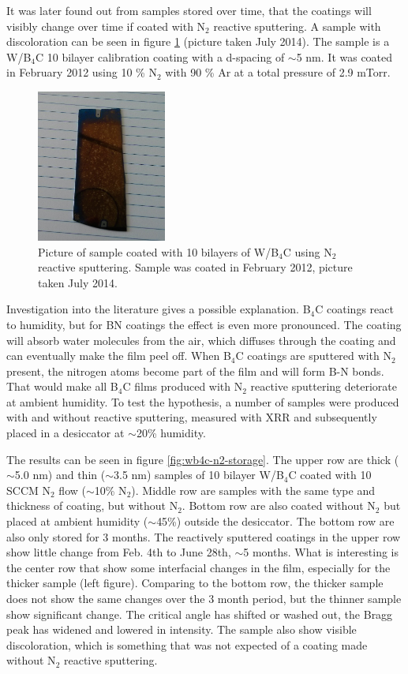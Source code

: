 It was later found out from samples stored over time, that the coatings will visibly change over time if coated with N$_2$ reactive sputtering. A sample with discoloration can be seen in figure \ref{fig:discolor} (picture taken July 2014). The sample is a W/B$_4$C 10 bilayer calibration coating with a d-spacing of $\sim$5 nm. It was coated in February 2012 using 10 \% N$_2$ with 90 \% Ar at a total pressure of 2.9 mTorr.

\begin{figure}[!h]
	\center
	\includegraphics[height=5cm]{figures/athena/coatings/si5556.jpg}
\caption{\footnotesize Picture of sample coated with 10 bilayers of W/B$_4$C using N$_2$ reactive sputtering. Sample was coated in February 2012, picture taken July 2014.}\label{fig:discolor}
\end{figure}

Investigation into the literature gives a possible explanation. B$_4$C coatings react to humidity, but for BN coatings the effect is even more pronounced. The coating will absorb water molecules from the air, which diffuses through the coating and can eventually make the film peel off\cite{Cardinale:1994ha}. When B$_4$C coatings are sputtered with N$_2$ present, the nitrogen atoms become part of the film and will form B-N bonds. That would make all B$_4$C films produced with N$_2$ reactive sputtering deteriorate at ambient humidity. To test the hypothesis, a number of samples were produced with and without reactive sputtering, measured with XRR and subsequently placed in a desiccator at $\sim$20\% humidity.

The results can be seen in figure \ref{fig:wb4c-n2-storage}. The upper row are thick ($\sim$5.0 nm) and thin ($\sim$3.5 nm) samples of 10 bilayer W/B$_4$C coated with 10 SCCM N$_2$ flow ($\sim$10\% N$_2$). Middle row are samples with the same type and thickness of coating, but without N$_2$. Bottom row are also coated without N$_2$ but placed at ambient humidity ($\sim$45\%) outside the desiccator. The bottom row are also only stored for 3 months. The reactively sputtered coatings in the upper row show little change from Feb. 4th to June 28th, $\sim$5 months. What is interesting is the center row that show some interfacial changes in the film, especially for the thicker sample (left figure). Comparing to the bottom row, the thicker sample does not show the same changes over the 3 month period, but the thinner sample show significant change. The critical angle has shifted or washed out, the Bragg peak has widened and lowered in intensity. The sample also show visible discoloration, which is something that was not expected of a coating made without N$_2$ reactive sputtering.

